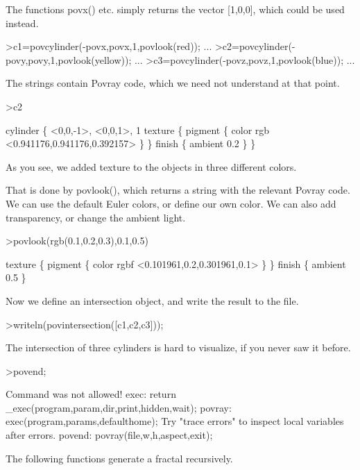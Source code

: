 \documentclass[a4paper,10pt]{article}
\begin{document}
\begin{eulernotebook}
\begin{eulercomment}
The functions povx() etc. simply returns the vector [1,0,0], which could be used instead.
\end{eulercomment}
\begin{eulerprompt}
>c1=povcylinder(-povx,povx,1,povlook(red)); ...
>c2=povcylinder(-povy,povy,1,povlook(yellow)); ...
>c3=povcylinder(-povz,povz,1,povlook(blue)); ...
\end{eulerprompt}
\begin{eulercomment}
The strings contain Povray code, which we need not understand at that
point.
\end{eulercomment}
\begin{eulerprompt}
>c2
\end{eulerprompt}
\begin{euleroutput}
  cylinder \{ <0,0,-1>, <0,0,1>, 1
   texture \{ pigment \{ color rgb <0.941176,0.941176,0.392157> \}  \} 
   finish \{ ambient 0.2 \} 
   \}
\end{euleroutput}
\begin{eulercomment}
As you see, we added texture to the objects in three different colors.

That is done by povlook(), which returns a string with the relevant
Povray code. We can use the default Euler colors, or define our own
color. We can also add transparency, or change the ambient light.
\end{eulercomment}
\begin{eulerprompt}
>povlook(rgb(0.1,0.2,0.3),0.1,0.5)
\end{eulerprompt}
\begin{euleroutput}
   texture \{ pigment \{ color rgbf <0.101961,0.2,0.301961,0.1> \}  \} 
   finish \{ ambient 0.5 \} 
  
\end{euleroutput}
\begin{eulercomment}
Now we define an intersection object, and write the result to the
file.
\end{eulercomment}
\begin{eulerprompt}
>writeln(povintersection([c1,c2,c3]));
\end{eulerprompt}
\begin{eulercomment}
The intersection of three cylinders is hard to visualize, if you never
saw it before.
\end{eulercomment}
\begin{eulerprompt}
>povend;
\end{eulerprompt}
\begin{euleroutput}
  Command was not allowed!
  exec:
      return _exec(program,param,dir,print,hidden,wait);
  povray:
      exec(program,params,defaulthome);
  Try "trace errors" to inspect local variables after errors.
  povend:
      povray(file,w,h,aspect,exit); 
\end{euleroutput}
\begin{eulercomment}
The following functions generate a fractal recursively.


\end{eulercomment}
\end{eulernotebook}
\end{document}
